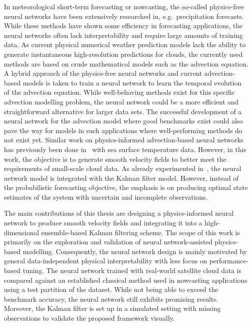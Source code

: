 In meteorological short-term forecasting or nowcasting, the so-called physics-free neural networks have been extensively researched in, e.g.\ precipitation forecasts.~\cite{rainnet, metnet}
While these methods have shown some efficiency in forecasting applications, the neural networks often lack interpretability and require large amounts of training data.
As current physical numerical weather prediction models lack the ability to generate instantaneous high-resolution predictions for clouds, the currently used methods are based on crude mathematical models such as the advection equation.
A hybrid approach of the physics-free neural networks and current advection-based models is taken to train a neural network to learn the temporal evolution of the advection equation.
While well-behaving methods exist for this specific advection modelling problem, the neural network could be a more efficient and straightforward alternative for larger data sets.
The successful development of a neural network for the advection model where good benchmarks exist could also pave the way for models in such applications where well-performing methods do not exist yet.
Similar work on physics-informed advection-based neural networks has previously been done in~\cite{deepide, debezenac} with sea surface temperature data.
However, in this work, the objective is to generate smooth velocity fields to better meet the requirements of small-scale cloud data.
As already experimented in~\cite{deepide}, the neural network model is integrated with the Kalman filter model.
However, instead of the probabilistic forecasting objective, the emphasis is on producing optimal state estimates of the system with uncertain and incomplete observations.

The main contributions of this thesis are designing a physics-informed neural network to produce smooth velocity fields and integrating it into a high-dimensional ensemble-based Kalman filtering scheme.
The scope of this work is primarily on the exploration and validation of neural network-assisted physics-based modelling.
Consequently, the neural network design is mainly motivated by general data-independent physical interpretability with less focus on performance-based tuning.
The neural network trained with real-world satellite cloud data is compared against an established classical method used in nowcasting applications using a test partition of the dataset.
While not being able to exceed the benchmark accuracy, the neural network still exhibits promising results.
Moreover, the Kalman filter is set up in a simulated setting with missing observations to validate the proposed framework visually.

